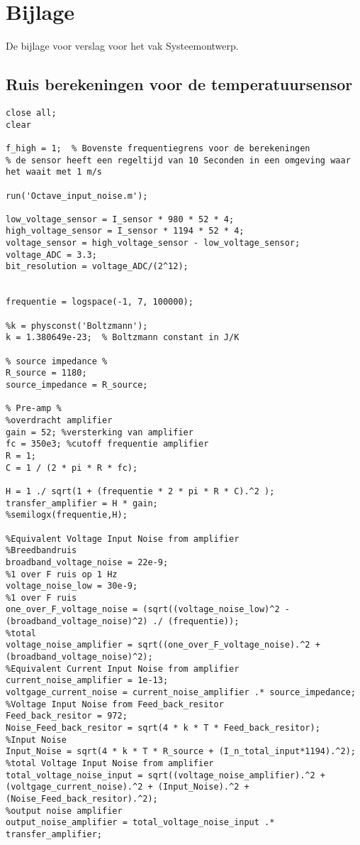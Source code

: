 \newpage
\section{Bijlage}
De bijlage voor verslag voor het vak Systeemontwerp.

\subsection{Ruis berekeningen voor de temperatuursensor}
\begin{lstlisting}[caption={Octave code voor de ruis berekeningen van de temperatuur sensor}, label={lst:octave_code_noise}]
close all;
clear

f_high = 1;  % Bovenste frequentiegrens voor de berekeningen
% de sensor heeft een regeltijd van 10 Seconden in een omgeving waar het waait met 1 m/s

run('Octave_input_noise.m');

low_voltage_sensor = I_sensor * 980 * 52 * 4;
high_voltage_sensor = I_sensor * 1194 * 52 * 4;
voltage_sensor = high_voltage_sensor - low_voltage_sensor;
voltage_ADC = 3.3;
bit_resolution = voltage_ADC/(2^12);


frequentie = logspace(-1, 7, 100000);

%k = physconst('Boltzmann');
k = 1.380649e-23;  % Boltzmann constant in J/K

% source impedance %
R_source = 1180;
source_impedance = R_source;

% Pre-amp %
%overdracht amplifier
gain = 52; %versterking van amplifier
fc = 350e3; %cutoff frequentie amplifier
R = 1;
C = 1 / (2 * pi * R * fc);

H = 1 ./ sqrt(1 + (frequentie * 2 * pi * R * C).^2 );
transfer_amplifier = H * gain;
%semilogx(frequentie,H);

%Equivalent Voltage Input Noise from amplifier
%Breedbandruis
broadband_voltage_noise = 22e-9;
%1 over F ruis op 1 Hz
voltage_noise_low = 30e-9;
%1 over F ruis
one_over_F_voltage_noise = (sqrt((voltage_noise_low)^2 - (broadband_voltage_noise)^2) ./ (frequentie));
%total
voltage_noise_amplifier = sqrt((one_over_F_voltage_noise).^2 + (broadband_voltage_noise)^2);
%Equivalent Current Input Noise from amplifier
current_noise_amplifier = 1e-13;
voltgage_current_noise = current_noise_amplifier .* source_impedance;
%Voltage Input Noise from Feed_back_resitor
Feed_back_resitor = 972;
Noise_Feed_back_resitor = sqrt(4 * k * T * Feed_back_resitor);
%Input Noise
Input_Noise = sqrt(4 * k * T * R_source + (I_n_total_input*1194).^2);
%total Voltage Input Noise from amplifier
total_voltage_noise_input = sqrt((voltage_noise_amplifier).^2 + (voltgage_current_noise).^2 + (Input_Noise).^2 + (Noise_Feed_back_resitor).^2);
%output noise amplifier
output_noise_amplifier = total_voltage_noise_input .* transfer_amplifier;


\end{lstlisting}
